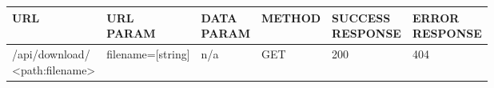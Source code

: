 \begin{tabular}[h]{llllll}
URL          & \specialcell{URL\\PARAM}     & \specialcell{DATA\\PARAM}  & METHOD &  \specialcell{SUCCESS\\RESPONSE} & \specialcell{ERROR\\RESPONSE} \\ \hline
\specialcell{/api/download/\\<path:filename>} &  filename=[string] & n/a        & GET    & 200              & 404            \\ 
\end{tabular}

